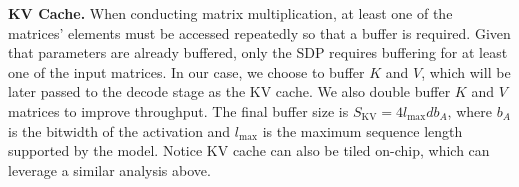 \textbf{KV Cache.}
When conducting matrix multiplication, at least one of the matrices' elements must be accessed repeatedly so that a buffer is required.
Given that parameters are already buffered, only the SDP requires buffering for at least one of the input matrices.
In our case, we choose to buffer $K$ and $V$, which will be later passed to the decode stage as the KV cache.
We also double buffer $K$ and $V$ matrices to improve throughput.
The final buffer size is $S_{\text{KV}}=4l_{\max}db_{A}$, where $b_{A}$ is the bitwidth of the activation and $l_{\max}$ is the maximum sequence length supported by the model.
Notice KV cache can also be tiled on-chip, which can leverage a similar analysis above.


